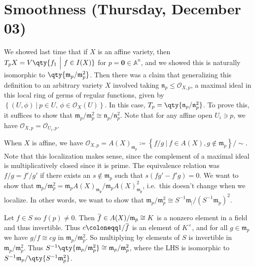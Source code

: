 \hypertarget{smoothness-thursday-december-03}{%
\section{Smoothness (Thursday, December
03)}\label{smoothness-thursday-december-03}}

We showed last time that if \(X\) is an affine variety, then
\(T_p X = V\qty{f_1 {~\mathrel{\Big|}~}f\in I(X)}\) for
\(p = \mathbf{0} \in {\mathbb{A}}^n\), and we showed this is naturally
isomorphic to \(\qty{\mathfrak{m}_p /\mathfrak{m}_p^2}\). Then there was
a claim that generalizing this definition to an arbitrary variety \(X\)
involved taking \(\mathfrak{n}_p \leq {\mathcal{O}}_{X, p}\), a maximal
ideal in this local ring of germs of regular functions, given by
\(\left\{{(U, \phi) {~\mathrel{\Big|}~}p\in U, \, \phi\in {\mathcal{O}}_{X}(U)}\right\}\).
In this case, \(T_p = \qty{\mathfrak{n}_p/\mathfrak{n}_p^2}\). To prove
this, it suffices to show that
\(\mathfrak{m}_p/\mathfrak{m}_p^2 \cong \mathfrak{n}_p/\mathfrak{n}_p^2\).
Note that for any affine open \(U_i \ni p\), we have
\({\mathcal{O}}_{X, p} = {\mathcal{O}}_{U_i, p}\).

When \(X\) is affine, we have
\({\mathcal{O}}_{X, p} = A(X)_{\mathfrak{m}_p} \coloneqq\left\{{f/g {~\mathrel{\Big|}~}f\in A(X), g\not\in \mathfrak{m}_p}\right\}/\sim\).
Note that this localization makes sense, since the complement of a
maximal ideal is multiplicatively closed since it is prime. The
equivalence relation was \(f/g = f'/g'\) if there exists an
\(s\not\in \mathfrak{m}_p\) such that \(s(fg' - f'g) = 0\). We want to
show that
\(\mathfrak{m}_p / \mathfrak{m}_p^2 = \mathfrak{m}_p A(X)_{\mathfrak{m_p}} / \mathfrak{m}_p A(X)_{\mathfrak{m_p}}^2\),
i.e.~this doesn't change when we localize. In other words, we want to
show that
\({\mathfrak{m}}_p / {\mathfrak{m}}_p^2 \cong S^{-1} {\mathfrak{m}}_[ / (S^{-1} {\mathfrak{m}}_p)^2\).

Let \(f\in S\) so \(f(p) \neq 0\). Then
\(\mkern 1.5mu\overline{\mkern-1.5muf\mkern-1.5mu}\mkern 1.5mu\in A(X) / \mathfrak{m}_p \cong K\)
is a nonzero element in a field and thus invertible. Thus
\(c\coloneqq 1/\mkern 1.5mu\overline{\mkern-1.5muf\mkern-1.5mu}\mkern 1.5mu\)
is an element of \(K^{\times}\), and for all \(g\in \mathfrak{m}_p\) we
have \(g/f \cong cg\) in \(\mathfrak{m}_p / \mathfrak{m}_p^2\). So
multiplying by elements of \(S\) is invertible in
\(\mathfrak{m}_p / \mathfrak{m}_p^2\). Thus
\(S^{-1} \qty{\mathfrak{m}_p / \mathfrak{m}_p^2} \cong \mathfrak{m}_p / \mathfrak{m}_p^2\),
where the LHS is isomorphic to
\(S^{-1} \mathfrak{m}_p / \qty{S^{-1}\mathfrak{m}_p^2}\).

